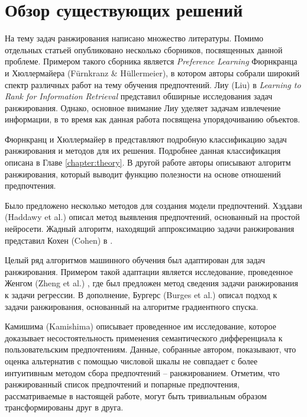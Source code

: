 \chapter{Обзор существующих решений}
\label{chapter:literature}

На тему задач ранжирования написано множество литературы. Помимо отдельных статьей опубликовано несколько сборников, посвященных данной проблеме. Примером такого сборника является \textit{Preference Learning} \cite{plbook:2010} Фюрнкранца и Хюллермайера (F{\"{u}}rnkranz \& H{\"{u}}llermeier), в котором авторы собрали широкий спектр различных работ на тему обучения предпочтений. Лиу (Liu) в \textit{Learning to Rank for Information Retrieval} \cite{Liu:2011} представил обширные исследования задач ранжирования. Однако, основное внимание Лиу уделяет задачам извлечение информации, в то время как данная работа посвящена упорядочиванию объектов.

Фюрнкранц и Хюллермайер в \cite{plbook:Introduction:2010} представляют подробную классификацию задач ранжирования и методов для их решения. Подробнее данная классификация описана в Главе \ref{chapter:theory}. В другой работе \cite{Furnkranz:2003} авторы описывают алгоритм ранжирования, который выводит функцию полезности на основе отношений предпочтения.

Было предложено несколько методов для создания модели предпочтений. Хэддави (Haddawy et al.) \cite{Haddawy:2003} описал метод выявления предпочтений, основанный на простой нейросети. Жадный алгоритм, находящий аппроксимацию задачи ранжирования представил Кохен (Cohen) в \cite{Cohen:1999}.

Целый ряд алгоритмов машинного обучения был адаптирован для задач ранжирования. Примером такой адаптации является исследование, проведенное Женгом (Zheng et al.) \cite{Zheng:2007}, где был предложен метод сведения задачи ранжирования к задачи регрессии. В дополнение, Бургерс (Burges et al.) \cite{Burges:2005} описал подход к задачи ранжирования, основанный на алгоритме градиентного спуска.

Камишима (Kamishima) \cite{Kamishima:2003} описывает проведенное им исследование, которое доказывает несостоятельность применения семантического дифференциала \cite{Osgood:1957} к пользовательским предпочтениям. Данные, собранные автором, показывают, что оценка альтернатив с помощью числовой шкалы не совпадает с более интуитивным методом сбора предпочтений – ранжированием. Отметим, что ранжированный список предпочтений и попарные предпочтения, рассматриваемые в настоящей работе, могут быть тривиальным образом трансформированы друг в друга.

